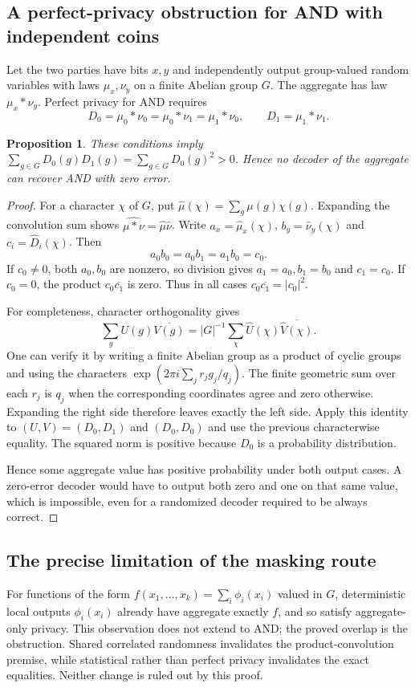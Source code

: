 \documentclass[11pt]{article}
\newtheorem{proposition}{Proposition}
\begin{document}
\subsection{A perfect-privacy obstruction for AND with independent coins}
Let the two parties have bits $x,y$ and independently output group-valued random variables with laws $\mu_x,\nu_y$ on a finite Abelian group $G$. The aggregate has law $\mu_x*\nu_y$. Perfect privacy for AND requires
\[
 D_0=\mu_0*\nu_0=\mu_0*\nu_1=\mu_1*\nu_0,\qquad D_1=\mu_1*\nu_1.
\]
\begin{proposition}
These conditions imply $\sum_{g\in G}D_0(g)D_1(g)=\sum_{g\in G}D_0(g)^2>0$. Hence no decoder of the aggregate can recover AND with zero error.
\end{proposition}
\begin{proof}
For a character $\chi$ of $G$, put $\widehat\mu(\chi)=\sum_g\mu(g)\chi(g)$. Expanding the convolution sum shows $\widehat{\mu*\nu}=\widehat\mu\widehat\nu$. Write $a_x=\widehat\mu_x(\chi)$, $b_y=\widehat\nu_y(\chi)$ and $c_i=\widehat D_i(\chi)$. Then
\[
 a_0b_0=a_0b_1=a_1b_0=c_0.
\]
If $c_0\ne0$, both $a_0,b_0$ are nonzero, so division gives $a_1=a_0,b_1=b_0$ and $c_1=c_0$. If $c_0=0$, the product $c_0\overline{c_1}$ is zero. Thus in all cases $c_0\overline{c_1}=|c_0|^2$.

For completeness, character orthogonality gives
\[
 \sum_g U(g)\overline{V(g)}=|G|^{-1}\sum_\chi\widehat U(\chi)\overline{\widehat V(\chi)}.
\]
One can verify it by writing a finite Abelian group as a product of cyclic groups and using the characters $\exp(2\pi i\sum_j r_j g_j/q_j)$. The finite geometric sum over each $r_j$ is $q_j$ when the corresponding coordinates agree and zero otherwise. Expanding the right side therefore leaves exactly the left side. Apply this identity to $(U,V)=(D_0,D_1)$ and $(D_0,D_0)$ and use the previous characterwise equality. The squared norm is positive because $D_0$ is a probability distribution.

Hence some aggregate value has positive probability under both output cases. A zero-error decoder would have to output both zero and one on that same value, which is impossible, even for a randomized decoder required to be always correct.
\end{proof}
\subsection{The precise limitation of the masking route}
For functions of the form $f(x_1,\ldots,x_k)=\sum_i\phi_i(x_i)$ valued in $G$, deterministic local outputs $\phi_i(x_i)$ already have aggregate exactly $f$, and so satisfy aggregate-only privacy. This observation does not extend to AND; the proved overlap is the obstruction. Shared correlated randomness invalidates the product-convolution premise, while statistical rather than perfect privacy invalidates the exact equalities. Neither change is ruled out by this proof.
\end{document}
